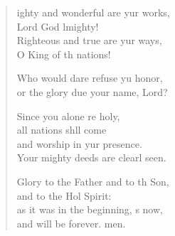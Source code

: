 \begin{verse}
  \begin{patverse}
ighty and wonderful are yur works,\Med\\
Lord God lmighty!\\
Righteous and true are yur ways,\Med\\
O King of th nations!

Who would dare refuse yu honor,\Med\\
or the glory due your name,  Lord?

Since you alone re holy,\Med\\
all nations shll come\\
and worship in yur presence.\Med\\
Your mighty deeds are clearl seen.

Glory to the Father and to th Son,\Med\\
and to the Hol Spirit:\\
as it was in the beginning, \pointup{\i}s now,\Med\\
and will be forever. men.
  \end{patverse}
\end{verse}
